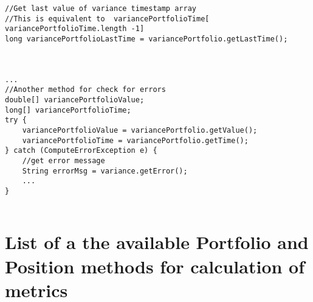 \documentclass[letterpaper]{report}
\begin{document}
\begin{lstlisting}
//Get last value of variance timestamp array
//This is equivalent to  variancePortfolioTime[ variancePortfolioTime.length -1]
long variancePortfolioLastTime = variancePortfolio.getLastTime();



...
//Another method for check for errors
double[] variancePortfolioValue;
long[] variancePortfolioTime;
try {
	variancePortfolioValue = variancePortfolio.getValue();
	variancePortfolioTime = variancePortfolio.getTime();
} catch (ComputeErrorException e) {
	//get error message 
	String errorMsg = variance.getError();
	...
}


\end{lstlisting}

\section{List of a the available Portfolio and Position methods for calculation of metrics}
\end{document}
